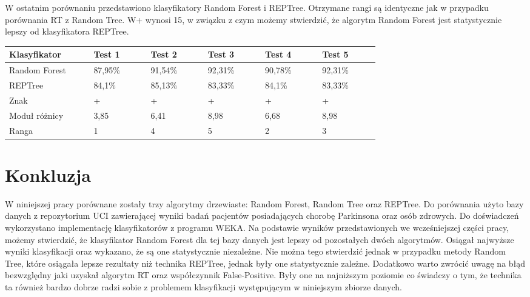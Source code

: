 \documentclass[conference]{IEEEtran}
\begin{document}
W ostatnim porównaniu przedstawiono klasyfikatory Random Forest i REPTree. Otrzymane rangi są identyczne jak w przypadku porównania RT z Random Tree. W+ wynosi 15, w związku z czym możemy stwierdzić, że algorytm Random Forest jest statystycznie lepszy od klasyfikatora REPTree.

\begin{table}[H]

	\begin{tabular}{|p{0.16\linewidth}|p{0.11\linewidth}|p{0.11\linewidth}|p{0.11\linewidth}|p{0.11\linewidth}|p{0.11\linewidth}|}%
	\hline\centering
	Klasyfikator 	& Test 1 & Test 2 & Test 3 & Test 4 & Test 5 \\ \hline\centering
	Random Forest	& 87,95\% & 91,54\% & 92,31\% & 90,78\% & 92,31\% \\ \hline\centering
	REPTree	& 84,1\% & 85,13\% & 83,33\% & 84,1\% & 83,33\% \\ \hline\centering
	Znak	& + & + & + & + & + \\ \hline\centering
	Moduł różnicy  & 3,85 & 6,41 & 8,98 & 6,68 & 8,98  \\ \hline\centering
	Ranga	& 1 & 4 & 5 & 2 & 3 \\ \hline
	\end{tabular}
\end{table}

\section{Konkluzja}
W niniejszej pracy porównane zostały trzy algorytmy drzewiaste: Random Forest, Random Tree oraz REPTree. Do porównania użyto bazy danych z repozytorium UCI zawierającej wyniki badań pacjentów posiadających chorobę Parkinsona oraz osób zdrowych. Do doświadczeń wykorzystano implementację klasyfikatorów z programu WEKA. Na podstawie wyników przedstawionych we wcześniejszej części pracy, możemy stwierdzić, że klasyfikator Random Forest dla tej bazy danych jest lepszy od pozostałych dwóch algorytmów. Osiągał najwyższe wyniki klasyfikacji oraz wykazano, że są one statystycznie niezależne. Nie można tego stwierdzić jednak w przypadku metody Random Tree, które osiągała lepsze rezultaty niż technika REPTree, jednak były one statystycznie zależne. Dodatkowo warto zwrócić uwagę na błąd bezwzględny jaki uzyskał algorytm RT oraz współczynnik False-Positive. Były one na najniższym poziomie co świadczy o tym, że technika ta również bardzo dobrze radzi sobie z problemem klasyfikacji występującym w niniejszym zbiorze danych. 
\end{document}
